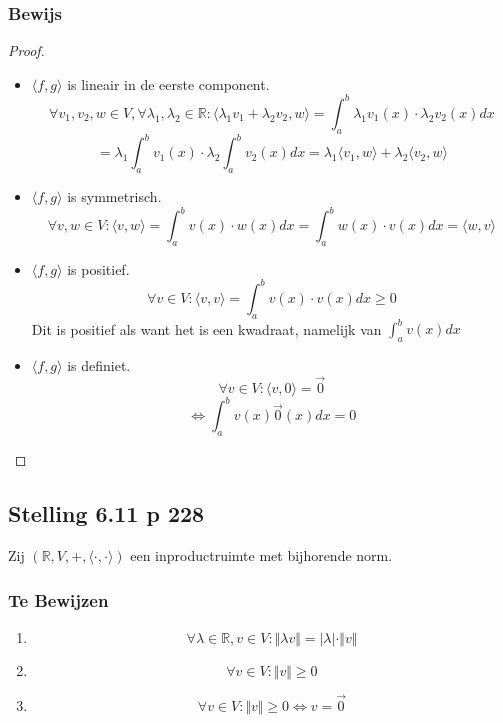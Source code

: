 \documentclass[lineaire_algebra_oplossingen.tex]{subfiles}
\begin{document}
\subsubsection*{Bewijs}
\begin{proof}
\begin{itemize}
\item $\langle f,g\rangle$ is lineair in de eerste component.
\[
\forall v_1,v_2,w\in V, \forall \lambda_1,\lambda_2 \in \mathbb{R}:
\langle \lambda_1v_1+\lambda_2v_2,w\rangle = \int_a^b\lambda_1 v_1(x)\cdot \lambda_2 v_2(x)dx
\]
\[
= \lambda_1\int_a^b v_1(x)\cdot \lambda_2\int_a^b v_2(x)dx = \lambda_1\langle v_1,w\rangle + \lambda_2\langle v_2,w\rangle
\]

\item $\langle f,g\rangle$ is symmetrisch.
\[
\forall v,w\in V: \langle v,w\rangle = \int_a^bv(x)\cdot w(x)dx= \int_a^bw(x)\cdot v(x)dx = \langle w,v\rangle
\]

\item $\langle f,g\rangle$ is positief.
\[
\forall v\in V: \langle v,v\rangle = \int_a^bv(x)\cdot v(x)dx \ge 0
\]
Dit is positief als want het is een kwadraat, namelijk van $\int_a^bv(x)dx$

\item $\langle f,g\rangle$ is definiet.
\[
\forall v\in V: \langle v,0\rangle = \vec{0}
\]
\[
\Leftrightarrow \int_a^bv(x)\vec{0}(x) dx = 0
\]
\end{itemize}
\end{proof}

\subsection{Stelling 6.11 p 228}
Zij $(\mathbb{R},V,+,\langle\cdot,\cdot\rangle)$ een inproductruimte met bijhorende norm.
\subsubsection*{Te Bewijzen}
\begin{enumerate}
\item 
\[
\forall \lambda\in\mathbb{R}, v\in V: \Vert\lambda v\Vert = \vert\lambda\vert\cdot \Vert v\Vert
\]

\item
\[
\forall v\in V: \Vert v\Vert\ge 0
\]

\item
\[
\forall v\in V: \Vert v\Vert\ge 0 \Leftrightarrow v=\vec{0}
\]
\end{enumerate}
\end{document}
